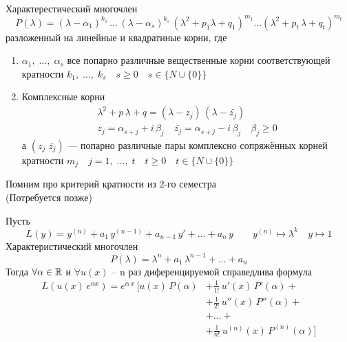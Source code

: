 \begin{Note}[Напоминание]~\\
    Характерестический многочлен
    \[
        P(\lambda)=(\lambda-\alpha_1)^{k_1}\,\dots\,(\lambda-\alpha_s)^{k_s}\,(\lambda^2+p_1 \lambda+q_1)^{m_1}\dots(\lambda^2+p_t\, \lambda+q_t)^{m_t}
    \]
    разложенный на линейные и квадратиные корни, где
    \begin{enumerate}
        \item $\alpha_1,\; \dots,\; \alpha_s$ все попарно различные вещественные корни соответствующей кратности $k_1,\; \dots,\; k_s \quad s \geqslant 0 \quad s \in \{N \cup \{0\}\}$
        
        \item Комплексные корни 
        \begin{gather*}
            \lambda^2+p\,\lambda+q=(\lambda-z_j)\,(\lambda-\bar{z_j})\\
            z_j = \alpha_{s + j} + i\,\beta_j \quad \bar{z_j} = \alpha_{s + j} - i\,\beta_j \quad \beta_j \geqslant 0
        \end{gather*}
        а $(z_j\; \bar{z_j})$ --- попарно различные пары комплексно сопряжённых корней кратности $m_j \quad j=1,\; \dots,\; t \quad t \geqslant 0 \quad t \in \{N \cup \{0\}\}$
    \end{enumerate}
\end{Note}

\begin{Note}
    Помним про критерий кратности из 2-го семестра\\
    (Потребуется позже) 
\end{Note}

\begin{Lem}
    Пусть 
    \[
        L(y)=y^{(n)}+a_1\,y^{(n-1)}+a_{n-1}\,y'+\dots+a_n\,y \qquad y^{(n)} \mapsto \lambda^k \quad y \mapsto 1
    \]
    Характеристический многочлен
    \[
        P(\lambda)= \lambda^n + a_1\,\lambda^{n-1} + \dots + a_n
    \]
    Тогда $\forall \alpha \in \mathbb{R}$ и $\forall u(x)$ -- n раз диференцируемой справедлива формула 
    \begin{align*}
        L(u(x)\,e^{\alpha x})=e^{\alpha\,x}\, [u(x)\,P(\alpha)&+\frac{1}{1!}\,u'(x)\,P'(\alpha)+\\
        &+\frac{1}{2!}\,u''(x)\,P''(\alpha)+\\
        &+\dots+\\
        &+\frac{1}{n!}\,u^{(n)}(x)\,P^{(n)}(\alpha)]
    \end{align*}
\end{Lem}

